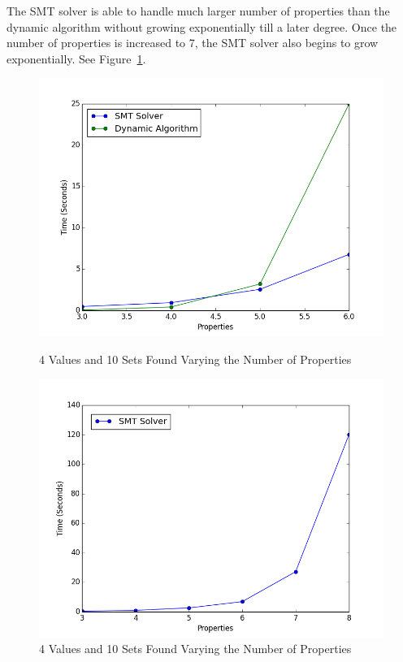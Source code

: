 \documentclass[pageno]{jpaper}
\begin{document}
The SMT solver is able to handle much larger number of properties than the dynamic algorithm without growing exponentially till a later degree. Once the number of properties is increased to 7, the SMT solver also begins to grow exponentially. See Figure~\ref{fig:SMTProp}.

\begin{figure}[htbb]
\begin{minipage}[b]{0.5\linewidth}
\centering
\includegraphics[width=.75\linewidth]{DvSPROP-v4p3456n10.png}
\caption{4 Values and 10 Sets Found Varying the Number of Properties}
\label{fig:DvSPROP}
\end{minipage}
\hspace{0.5cm}
\begin{minipage}[b]{0.5\linewidth}
\centering
\includegraphics[width=.75\linewidth]{SMTOnlyPROP-v4p345678n10.png}
\caption{4 Values and 10 Sets Found Varying the Number of Properties}
\label{fig:SMTProp}
\end{minipage}
\end{figure}
\end{document}
